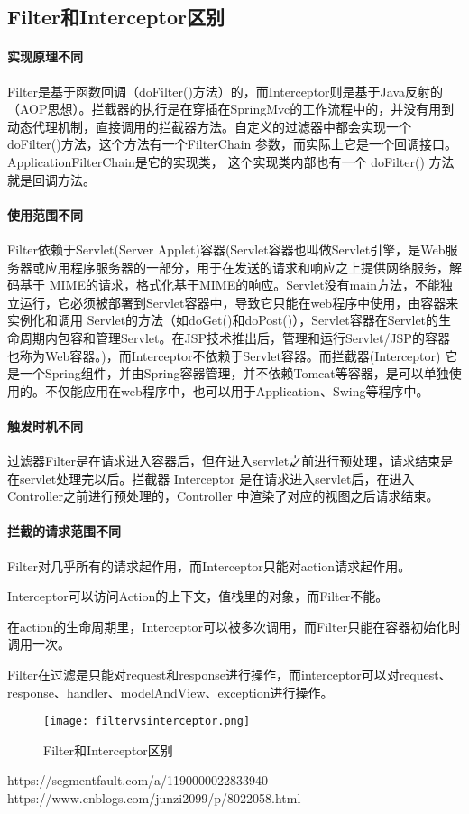 \documentclass[../../../interview-questions.tex]{subfiles}
\begin{document}
\subsection{Filter和Interceptor区别}

\paragraph{实现原理不同}

Filter是基于函数回调（doFilter()方法）的，而Interceptor则是基于Java反射的（AOP思想）。拦截器的执行是在穿插在SpringMvc的工作流程中的，并没有用到动态代理机制，直接调用的拦截器方法。自定义的过滤器中都会实现一个 doFilter()方法，这个方法有一个FilterChain 参数，而实际上它是一个回调接口。ApplicationFilterChain是它的实现类， 这个实现类内部也有一个 doFilter() 方法就是回调方法。

\paragraph{使用范围不同}

Filter依赖于Servlet(Server Applet)容器(Servlet容器也叫做Servlet引擎，是Web服务器或应用程序服务器的一部分，用于在发送的请求和响应之上提供网络服务，解码基于 MIME的请求，格式化基于MIME的响应。Servlet没有main方法，不能独立运行，它必须被部署到Servlet容器中，导致它只能在web程序中使用，由容器来实例化和调用 Servlet的方法（如doGet()和doPost()），Servlet容器在Servlet的生命周期内包容和管理Servlet。在JSP技术推出后，管理和运行Servlet/JSP的容器也称为Web容器。)，而Interceptor不依赖于Servlet容器。而拦截器(Interceptor) 它是一个Spring组件，并由Spring容器管理，并不依赖Tomcat等容器，是可以单独使用的。不仅能应用在web程序中，也可以用于Application、Swing等程序中。

\paragraph{触发时机不同}

过滤器Filter是在请求进入容器后，但在进入servlet之前进行预处理，请求结束是在servlet处理完以后。拦截器 Interceptor 是在请求进入servlet后，在进入Controller之前进行预处理的，Controller 中渲染了对应的视图之后请求结束。

\paragraph{拦截的请求范围不同}

Filter对几乎所有的请求起作用，而Interceptor只能对action请求起作用。

Interceptor可以访问Action的上下文，值栈里的对象，而Filter不能。

在action的生命周期里，Interceptor可以被多次调用，而Filter只能在容器初始化时调用一次。

Filter在过滤是只能对request和response进行操作，而interceptor可以对request、response、handler、modelAndView、exception进行操作。

\begin{figure}[htbp]
	\centering
	\texttt{[image: filtervsinterceptor.png]}
	\caption{Filter和Interceptor区别}
	\label{fig:filtervsinterceptor}
\end{figure}


https://segmentfault.com/a/1190000022833940
https://www.cnblogs.com/junzi2099/p/8022058.html
\end{document}
